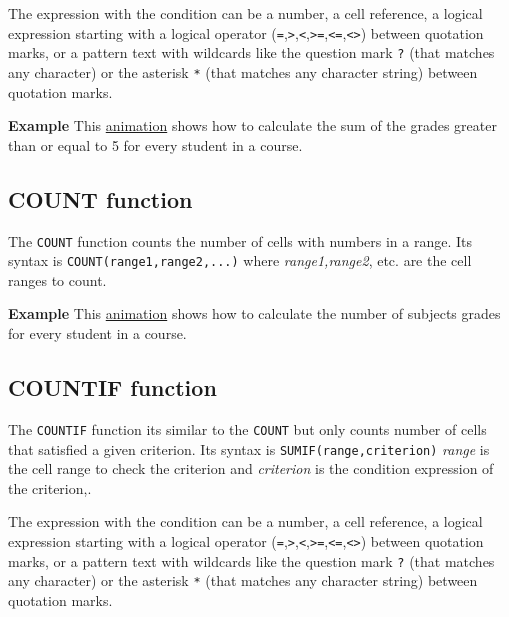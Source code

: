 The expression with the condition can be a number, a cell reference, a logical expression starting with a logical operator (\texttt{=},\texttt{\textgreater{}},\texttt{\textless{}},\texttt{\textgreater{}=},\texttt{\textless{}=},\texttt{\textless{}\textgreater{}}) between quotation marks, or a pattern text with wildcards like the question mark \texttt{?} (that matches any character) or the asterisk \texttt{*} (that matches any character string) between quotation marks.

\textbf{Example} This \href{http://aprendeconalf.es/office/excel/manual/img/example_function_sumif.gif}{animation} shows how to calculate the sum of the grades greater than or equal to 5 for every student in a course.

\subsection{COUNT function}\hypertarget{count-function}{}\label{count-function}

The \texttt{COUNT} function counts the number of cells with numbers in a range.  Its syntax is \texttt{COUNT(range1,range2,...)} where \emph{range1,range2}, etc. are the cell ranges to count.

\textbf{Example} This \href{http://aprendeconalf.es/office/excel/manual/img/example_function_count.gif}{animation} shows how to calculate the number of subjects grades for every student in a course.

\subsection{COUNTIF function}\hypertarget{countif-function}{}\label{countif-function}

The \texttt{COUNTIF} function its similar to the \texttt{COUNT} but only counts number of cells that satisfied a given criterion. Its syntax is \texttt{SUMIF(range,criterion)} \emph{range} is the cell range to check the criterion and \emph{criterion} is the condition expression of the criterion,.

The expression with the condition can be a number, a cell reference, a logical expression starting with a logical operator (\texttt{=},\texttt{\textgreater{}},\texttt{\textless{}},\texttt{\textgreater{}=},\texttt{\textless{}=},\texttt{\textless{}\textgreater{}}) between quotation marks, or a pattern text with wildcards like the question mark \texttt{?} (that matches any character) or the asterisk \texttt{*} (that matches any character string) between quotation marks.

